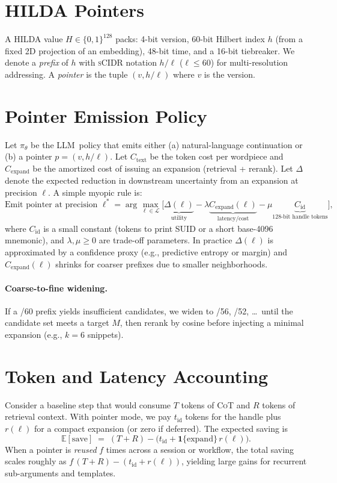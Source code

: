 \documentclass[11pt]{article}
\newcommand{\hilda}{\textsc{HILDA}}
\newcommand{\scidr}{\textsc{sCIDR}}
\newcommand{\suid}{\textsc{SUID}}
\newcommand{\llm}{\textsc{LLM}}
\newcommand{\cot}{\textsc{CoT}}
\begin{document}
\section{HILDA Pointers}
A \hilda{} value $H \in \{0,1\}^{128}$ packs: 4-bit version, 60-bit Hilbert index $h$ (from a fixed 2D projection of an embedding), 48-bit time, and a 16-bit tiebreaker. We denote a \emph{prefix} of $h$ with \scidr{} notation $h{/}\ell$ ($\ell \le 60$) for multi-resolution addressing. A \emph{pointer} is the tuple $(v, h{/}\ell)$ where $v$ is the version.

\section{Pointer Emission Policy}
Let $\pi_\theta$ be the \llm\ policy that emits either (a) natural-language continuation or (b) a pointer $p=(v,h{/}\ell)$. Let $C_{\mathrm{text}}$ be the token cost per wordpiece and $C_{\mathrm{expand}}$ be the amortized cost of issuing an expansion (retrieval + rerank). Let $\Delta$ denote the expected reduction in downstream uncertainty from an expansion at precision $\ell$. A simple myopic rule is:
\begin{equation}
\text{Emit pointer at precision } \ell^\ast = \arg\max_{\ell \in \mathcal{L}} \bigg[ \underbrace{\Delta(\ell)}_{\text{utility}} - \lambda \underbrace{C_{\mathrm{expand}}(\ell)}_{\text{latency/cost}} - \mu \underbrace{C_{\mathrm{id}}}_{\text{128-bit handle tokens}} \bigg],
\end{equation}
where $C_{\mathrm{id}}$ is a small constant (tokens to print \suid{} or a short base-4096 mnemonic), and $\lambda,\mu \!\ge\!0$ are trade-off parameters. In practice $\Delta(\ell)$ is approximated by a confidence proxy (e.g., predictive entropy or margin) and $C_{\mathrm{expand}}(\ell)$ shrinks for coarser prefixes due to smaller neighborhoods.

\paragraph{Coarse-to-fine widening.} If a /60 prefix yields insufficient candidates, we widen to /56, /52, \dots\ until the candidate set meets a target $M$, then rerank by cosine before injecting a minimal expansion (e.g., $k{=}6$ snippets).

\section{Token and Latency Accounting}
Consider a baseline step that would consume $T$ tokens of \cot{} and $R$ tokens of retrieval context. With pointer mode, we pay $t_{\mathrm{id}}$ tokens for the handle plus $r(\ell)$ for a compact expansion (or zero if deferred). The expected saving is
\begin{equation}
\mathbb{E}[\text{save}] \;=\; (T{+}R) - \big( t_{\mathrm{id}} + \mathbf{1}\{\text{expand}\}\, r(\ell) \big).
\end{equation}
When a pointer is \emph{reused} $f$ times across a session or workflow, the total saving scales roughly as $f\,(T{+}R) - (t_{\mathrm{id}} + r(\ell))$, yielding large gains for recurrent sub-arguments and templates.
\end{document}

